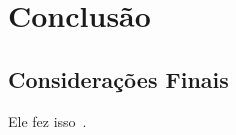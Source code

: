 \chapter{Conclusão} \label{cap6}
\section{Considerações Finais}


Ele fez isso~\cite{jernigan2009}.

